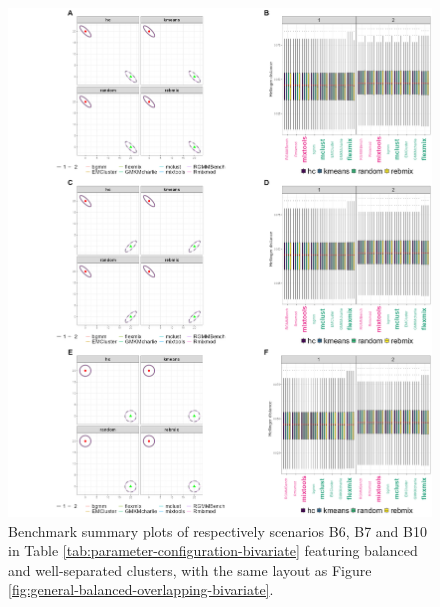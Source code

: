 \newpage

\begin{figure}

{\centering \includegraphics[width=1\linewidth]{figs/bivariate/multivariate_balanced_well_separated} 

}

\caption{Benchmark summary plots of respectively scenarios B6, B7 and B10 in Table \ref{tab:parameter-configuration-bivariate} featuring balanced and well-separated clusters, with the same layout as Figure \ref{fig:general-balanced-overlapping-bivariate}.}\label{fig:general-balanced-well-separated-bivariate}
\end{figure}

\newpage

